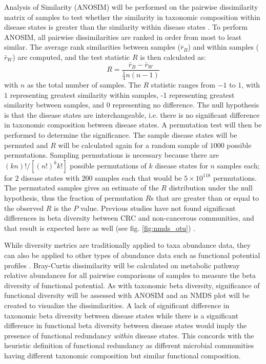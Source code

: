 \documentclass[11pt]{article}
\begin{document}
Analysis of Similarity (ANOSIM) will be performed on the pairwise dissimilarity matrix of samples to test whether the similarity in taxonomic composition within disease states is greater than the similarity within disease states \cite{clarke_non-parametric_1993}.
To perform ANOSIM, all pairwise dissimilarities are ranked in order from most to least similar.
The average rank similarities between samples ($\bar{r}_B$) and within samples ($\bar{r}_W$) are computed, and the test statistic $R$ is then calculated as:
$$R = \frac{ \bar{r}_B - \bar{r}_W }{ \frac{1}{4} n(n-1) }$$
with $n$ as the total number of samples.
The $R$ statistic ranges from $-1$ to $1$, with $1$ representing greatest similarity within samples, -1 representing greatest similarity between samples, and $0$ representing no difference.
The null hypothesis is that the disease states are interchangeable, i.e. there is no significant difference in taxonomic composition between disease states.
A permutation test will then be performed to determine the significance.
The sample disease states will be permuted and $R$ will be calculated again for a random sample of $1000$ possible permutations.
Sampling permutations is necessary because there are $(kn)!/[(n!)^k k!]$ possible permutations of $k$ disease states for $n$ samples each;
for $2$ disease states with $200$ samples each that would be $5 \times 10^{118}$ permutations.
The permutated samples gives an estimate of the $R$ distribution under the null hypothesis,
thus the fraction of permutation $R$s that are greater than or equal to the observed $R$ is the $P$ value.
Previous studies have not found significant differences in beta diversity between CRC and non-cancerous communities, and that result is expected here as well (see fig. \ref{fig:nmds_otu}) \cite{weir_stool_2013, hannigan_diagnostic_2018, topcuoglu_framework_2020}.

While diversity metrics are traditionally applied to taxa abundance data,
they can also be applied to other types of abundance data such as functional potential profiles \cite{franzosa_species-level_2018}.
Bray-Curtis dissimilarity will be calculated on metabolic pathway relative abundances for all pairwise comparisons of samples to measure the beta diversity of functional potential.
As with taxonomic beta diversity, significance of functional diversity will be assessed with ANOSIM and an NMDS plot will be created to visualize the dissimilarities.
A lack of significant difference in taxonomic beta diversity between disease states
while there is a significant difference in functional beta diversity between disease states
would imply the presence of functional redundancy \textit{within} disease states.
This concords with the heuristic definition of functional redundancy as different microbial communities having different taxonomic composition but similar functional composition.
\end{document}

